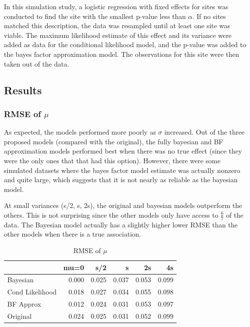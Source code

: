 \documentclass[AMA,STIX1COL]{WileyNJD-v2}\usepackage[]{graphicx}\usepackage[]{color}
\newenvironment{knitrout}{}{} %
\begin{document}
In this simulation study, a logistic regression with fixed effects for sites was conducted to find the site with the smallest p-value less than $\alpha$. If no sites matched this description, the data was resampled until at least one site was viable. The maximum likelihood estimate of this effect and its variance were added as data for the conditional likelihood model, and the p-value was added to the bayes factor approximation model.  The observations for this site were then taken out of the data.

\subsection{Results}











\subsubsection{RMSE of $\mu$}

As expected, the models performed more poorly as $\sigma$ increased. Out of the three proposed models (compared with the original), the fully bayesian and BF approximation models performed best when there was no true effect (since they were the only ones that that had this option). However, there were some simulated datasets where the bayes factor model estimate was actually nonzero and quite large, which suggests that it is not nearly as reliable as the bayesian model.


At small variances (s/2, s,  2s), the original and bayesian models outperform the others. This is not surprising since the other models only have access to $\frac{6}{7}$ of the data. The Bayesian model actually has a slightly higher lower RMSE than the other models when there is a true association.




\begin{knitrout}
\color{fgcolor}\begin{table}

\caption{\label{tab:unnamed-chunk-20}RMSE of $\mu$}
\centering
\begin{tabular}[t]{l|r|r|r|r|r}
\hline
  & mu=0 & s/2 & s & 2s & 4s\\
\hline
Bayesian & 0.000 & 0.025 & 0.037 & 0.053 & 0.099\\
\hline
Cond Likelihood & 0.018 & 0.027 & 0.034 & 0.055 & 0.098\\
\hline
BF Approx & 0.012 & 0.024 & 0.031 & 0.053 & 0.097\\
\hline
Original & 0.024 & 0.025 & 0.031 & 0.052 & 0.099\\
\hline
\end{tabular}
\end{table}


\end{knitrout}
\end{document}
